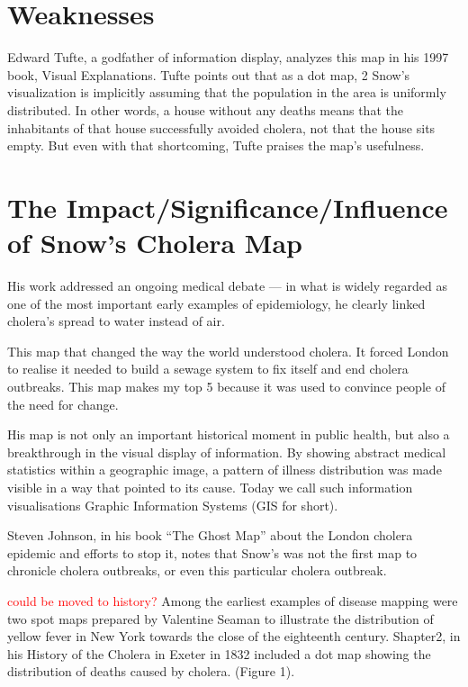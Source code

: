 \documentclass[12pt]{article}
\newcommand\todo[1]{\textcolor{red}{#1}}
\begin{document}
\section{Weaknesses}

Edward Tufte, a godfather of information display, analyzes this map in his 1997 book, Visual Explanations. Tufte points out that as a dot map, 2 Snow’s visualization is implicitly assuming that the population in the area is uniformly distributed. In other words, a house without any deaths means that the inhabitants of that house successfully avoided cholera, not that the house sits empty. But even with that shortcoming, Tufte praises the map’s usefulness. \cite{blog}

\section{The Impact/Significance/Influence of Snow's Cholera Map}

His work addressed an ongoing medical debate — in what is widely regarded as one of the most important early examples of epidemiology, he clearly linked cholera’s spread to water instead of air. \cite{blog}

This map that changed the way the world understood cholera. It forced London to realise it needed to build a sewage system to fix itself and end cholera outbreaks. This map makes my top 5 because it was used to convince people of the need for change. \cite{top5}

His map is not only an important historical moment in public health, but also a breakthrough in the visual display of information. By showing abstract medical statistics within a geographic image, a pattern of illness distribution was made visible in a way that pointed to its cause. Today we call such information visualisations Graphic Information Systems (GIS for short). \cite{test}

Steven Johnson, in his book “The Ghost Map” about the London cholera epidemic and efforts to stop it, notes that Snow’s was not the first map to chronicle cholera outbreaks, or even this particular cholera outbreak. \cite{history}

\todo{could be moved to history?}
Among the earliest examples of disease mapping were
two spot maps prepared by Valentine Seaman to illustrate
the distribution of yellow fever in New York
towards the close of the eighteenth century. Shapter2, in
his History of the Cholera in Exeter in 1832 included a dot
map showing the distribution of deaths caused by
cholera. (Figure 1). \cite{howe1970some}
\end{document}
